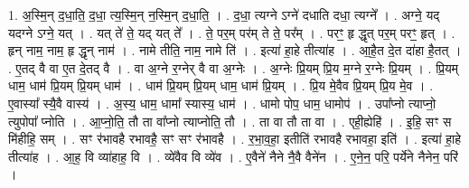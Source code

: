 \documentclass[17pt]{extarticle}
\begin{document}
1. अ॒स्मि॒न् द॒धा॒ति॒ द॒धा॒ त्य॒स्मि॒न् न॒स्मि॒न् द॒धा॒ति॒ । . द॒धा॒ त्यग्ने ऽग्ने॑ दधाति दधा॒ त्यग्ने᳚ । . अग्ने॒ यद् यदग्ने ऽग्ने॒ यत् । . यत् ते॑ ते॒ यद् यत् ते᳚ । . ते॒ पर॒म् पर॑म् ते ते॒ पर᳚म् । . परꣳ॒॒ हृ द्धृत् पर॒म् परꣳ॒॒ हृत् । . हृन् नाम॒ नाम॒ हृ द्धृन् नाम॑ । . नामे तीति॒ नाम॒ नामे ति॑ । . इत्या॑ हा॒हे तीत्या॑ह । . आ॒है॒त दे॒त दा॑हा है॒तत् । . ए॒तद् वै वा ए॒त दे॒तद् वै । . वा अ॒ग्ने र॒ग्नेर् वै वा अ॒ग्नेः । . अ॒ग्नेः प्रि॒यम् प्रि॒य म॒ग्ने र॒ग्नेः प्रि॒यम् । . प्रि॒यम् धाम॒ धाम॑ प्रि॒यम् प्रि॒यम् धाम॑ । . धाम॑ प्रि॒यम् प्रि॒यम् धाम॒ धाम॑ प्रि॒यम् । . प्रि॒य मे॒वैव प्रि॒यम् प्रि॒य मे॒व । . ए॒वास्या᳚ स्यै॒वै वास्य॑ । . अ॒स्य॒ धाम॒ धामा᳚ स्यास्य॒ धाम॑ । . धामो पोप॒ धाम॒ धामोप॑ । . उपा᳚प्नो त्याप्नो॒ त्युपोपा᳚ प्नोति । . आ॒प्नो॒ति॒ तौ ता वा᳚प्नो त्याप्नोति॒ तौ । . ता वा तौ ता वा । . एही॒ह्येहि॑ । . इ॒हि॒ सꣳ स मि॑हीहि॒ सम् । . सꣳ र॑भावहै रभावहै॒ सꣳ सꣳ र॑भावहै । . र॒भा॒व॒हा॒ इतीति॑ रभावहै रभावहा॒ इति॑ । . इत्या॑ हा॒हे तीत्या॑ह । . आ॒ह॒ वि व्या॑हाह॒ वि । . व्ये॑वैव वि व्ये॑व । . ए॒वैने॑ नैने नै॒वै वैने॑न । . ए॒ने॒न॒ परि॒ पर्ये॑ने नैनेन॒ परि॑ । \newline
\end{document}
